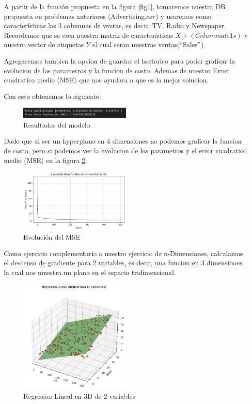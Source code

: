 \documentclass{iopjournal}
\begin{document}
A partir de la función propuesta en la figura \ref{fig1}, tomaremos nuestra DB propuesta en problemas anteriores (Advertising.csv) y usaremos como características las 3 columnas de ventas, es decir, TV, Radio y Newspaper.
Recordemos que se crea nuestra matriz de características $X + (Columna de 1s)$ y nuestro vector de etiquetas $Y$ el cual seran nuestras ventas(``Sales'').

Agregaremos tambien la opcion de guardar el hostorico para poder graficar la evolucion de los parametros y la funcion de costo. Ademas de nuestro 
Error cuadratico medio (MSE) que nos ayudara a que es la mejor solucion.

Con esto obtenemos lo siguiente:

\begin{figure}[H]
 \centering
        \includegraphics[width=0.5\textwidth]{rsc/Resultados.png}
 \caption{Resultados del modelo}
\label{fig2}
\end{figure}

Dado que al ser un hyperplano en 4 dimensiones no podemos graficar la funcion de costo, pero si podemos ver la evolucion de los parametros y 
el error cuadratico medio (MSE) en la figura \ref{fig3}.

\begin{figure}[H]
 \centering
        \includegraphics[width=0.5\textwidth]{rsc/Grafica_Error.png}
 \caption{Evolución del MSE}
\label{fig3}
\end{figure}

Como ejercicio complementario a nuestro ejercicio de n-Dimensiones, calculamos el descenso de gradiente para 2 variables, es decir,
una funcion en 3 dimensiones la cual nos muestra un plano en el espacio tridimensional.
\begin{figure}[H]
 \centering
        \includegraphics[width=0.5\textwidth]{rsc/Espacio_3D.png}
 \caption{Regresion Lineal en 3D de 2 variables}
\label{fig4}
\end{figure}
\end{document}

